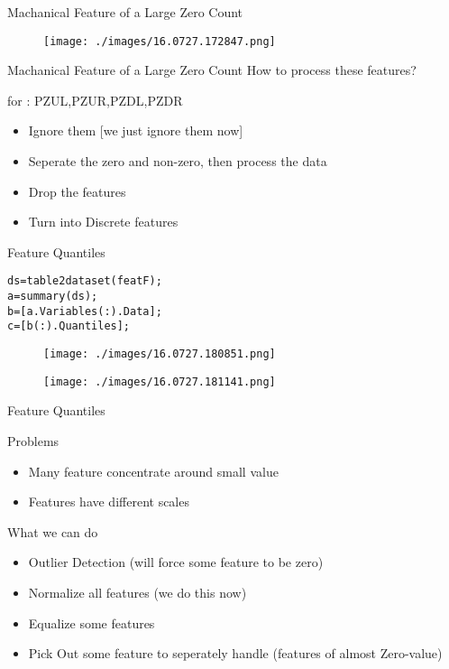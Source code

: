 \documentclass[bigger]{beamer}
\begin{document}
\begin{frame}[label=sec-3-4]{Machanical Feature of a Large Zero Count}
\begin{figure}[htb]
\centering
\texttt{[image: ./images/16.0727.172847.png]}
\end{figure}
\end{frame}
\begin{frame}[label=sec-3-5]{Machanical Feature of a Large Zero Count}
How to process these features?

\vspace{10pt}

for : PZUL,PZUR,PZDL,PZDR

\vspace{10pt}

\begin{itemize}
\item Ignore them [we just ignore them now]
\item Seperate the zero and non-zero, then process the data
\item Drop the features
\item Turn into Discrete features
\end{itemize}
\end{frame}
\begin{frame}[fragile,label=sec-3-6]{Feature Quantiles}
 \begin{verbatim}
ds=table2dataset(featF);
a=summary(ds);
b=[a.Variables(:).Data];
c=[b(:).Quantiles];
\end{verbatim}


\begin{figure}[htb]
\centering
\texttt{[image: ./images/16.0727.180851.png]}
\end{figure}

\begin{figure}[htb]
\centering
\texttt{[image: ./images/16.0727.181141.png]}
\end{figure}
\end{frame}
\begin{frame}[label=sec-3-7]{Feature Quantiles}
\begin{block}{Problems}
\begin{itemize}
\item Many feature concentrate around small value
\item Features have different scales
\end{itemize}
\end{block}
\begin{block}{What we can do}
\begin{itemize}
\item Outlier Detection (will force some feature to be zero)
\item Normalize all features (we do this now)
\item Equalize some features
\item Pick Out some feature to seperately handle (features of almost
Zero-value)
\end{itemize}
\end{block}
\end{frame}
\end{document}
